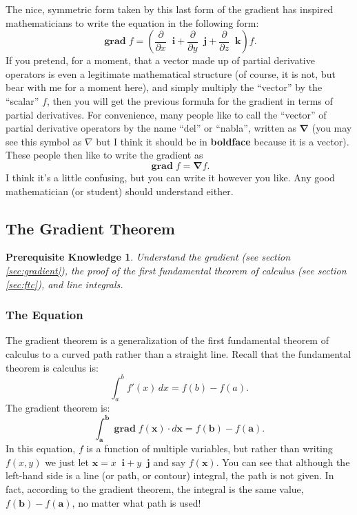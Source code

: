 \documentclass{myarticle}
\DeclareMathOperator{\grad}{\mathbf{grad}}
\renewcommand{\vec}[1]{\mathbf{#1}}
\newcommand{\unitvector}[1]{
  \mathop{}\!\vec{#1}
}
\newcommand{\ih}{\unitvector{i}}
\newcommand{\jh}{\unitvector{j}}
\newcommand{\kh}{\unitvector{k}}
\newcommand{\del}{\boldsymbol{\nabla}}
\theoremstyle{nospace}
\newtheorem*{oldprereq}{Prerequisite Knowledge}
\newenvironment{prereq}{\begin{mdframed}\begin{oldprereq}}{\end{oldprereq}\end{mdframed}}
\newtheorem{old series theorem}{Theorem}
\newenvironment{series theorem}{\begin{mdframed}\begin{old series theorem}}{\end{old series theorem}\end{mdframed}}
\begin{document}
The nice, symmetric form taken by this last form of the gradient has inspired mathematicians to write the equation in the following form: \[ \grad f = \left(\frac{\partial}{\partial x} \ih + \frac{\partial}{\partial y} \jh + \frac{\partial}{\partial z} \kh\right)f. \] If you pretend, for a moment, that a vector made up of partial derivative operators is even a legitimate mathematical structure (of course, it is not, but bear with me for a moment here), and simply multiply the ``vector'' by the ``scalar'' $f$, then you will get the previous formula for the gradient in terms of partial derivatives. For convenience, many people like to call the ``vector'' of partial derivative operators by the name ``del'' or ``nabla'', written as $\del$ (you may see this symbol as $\nabla$ but I think it should be in \textbf{boldface} because it is a vector). These people then like to write the gradient as \[ \grad f = \del f. \] I think it's a little confusing, but you can write it however you like. Any good mathematician (or student) should understand either.

\subsection{The Gradient Theorem} \label{sec:gradient theorem}

\begin{prereq} Understand the gradient (see section \ref{sec:gradient}), the proof of the first fundamental theorem of calculus (see section \ref{sec:ftc}), and line integrals. \end{prereq}

\subsubsection{The Equation} \label{sec:gradient theorem equation}

The gradient theorem is a generalization of the first fundamental theorem of calculus to a curved path rather than a straight line. Recall that the fundamental theorem is calculus is: \[ \int_a^b f'(x) \,dx = f(b) - f(a). \] The gradient theorem is: \[ \int_\vec{a}^\vec{b} \grad f(\vec{x}) \cdot d\vec{x} = f(\vec{b}) - f(\vec{a}). \] In this equation, $f$ is a function of multiple variables, but rather than writing $f(x, y)$ we just let $\vec{x} = x \ih + y \jh$ and say $f(\vec{x})$. You can see that although the left-hand side is a line (or path, or contour) integral, the path is not given. In fact, according to the gradient theorem, the integral is the same value, $f(\vec{b}) - f(\vec{a})$, no matter what path is used!
\end{document}
